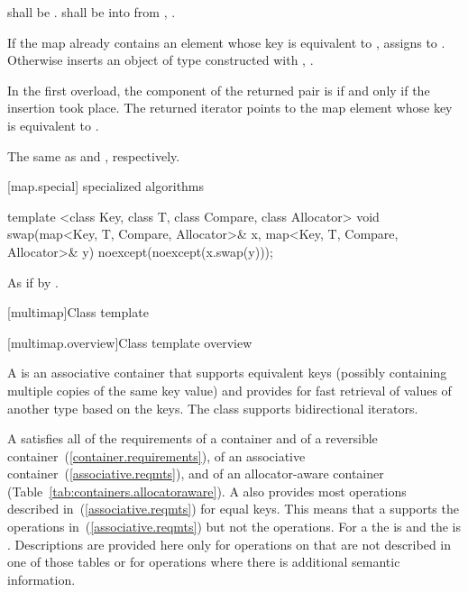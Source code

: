 \begin{itemdescr}
\pnum
\requires
{} shall be .
 shall be  into 
from , .

\pnum
\effects
If the map already contains an element 
whose key is equivalent to ,
assigns  to .
Otherwise inserts an object of type 
constructed with , .

\pnum
\returns
In the first overload,
the  component of the returned pair is 
if and only if the insertion took place.
The returned iterator points to the map element
whose key is equivalent to .

\pnum
\complexity
The same as  and ,
respectively.
\end{itemdescr}

[map.special]{ specialized algorithms}

%
\begin{itemdecl}
template <class Key, class T, class Compare, class Allocator>
  void swap(map<Key, T, Compare, Allocator>& x,
            map<Key, T, Compare, Allocator>& y)
    noexcept(noexcept(x.swap(y)));
\end{itemdecl}

\begin{itemdescr}
\pnum
\effects
As if by .
\end{itemdescr}

[multimap]{Class template }

[multimap.overview]{Class template  overview}

\pnum
{}%
A
is an associative container that supports equivalent keys (possibly containing multiple copies of
the same key value) and provides for fast retrieval of values of another type
based on the keys.
The
class
supports bidirectional iterators.

\pnum
A
 satisfies all of the requirements of a container and of a
reversible container~(\ref{container.requirements}), of an associative
container~(\ref{associative.reqmts}), and of an allocator-aware container
(Table~\ref{tab:containers.allocatoraware}).
A
also provides most operations described in~(\ref{associative.reqmts})
for equal keys.
This means that a
supports the
operations in~(\ref{associative.reqmts})
but not the
operations.
For a
the
is
and the
is
.
Descriptions are provided here only for operations on
that are not described in one of those tables
or for operations where there is additional semantic information.

